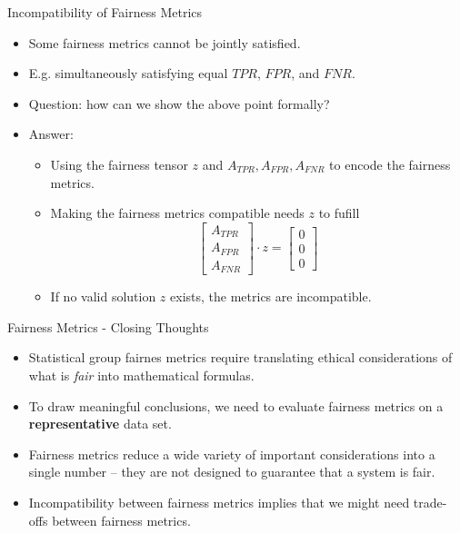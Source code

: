 \documentclass[11pt,compress,t,notes=noshow, xcolor=table]{beamer}
\begin{document}
\begin{vbframe}{Incompatibility of Fairness Metrics}
    \small
    \begin{itemize}
        \small
        \item Some fairness metrics cannot be jointly satisfied.
        \item E.g. simultaneously satisfying equal $TPR$, $FPR$, and $FNR$.
        \item Question: how can we show the above point formally?
        \item Answer: 
            \begin{itemize}
                \small
                \item Using the fairness tensor $z$ and $A_{TPR}, A_{FPR}, A_{FNR}$ to encode the fairness metrics.
                \vspace{5pt}
                
                \item Making the fairness metrics compatible needs $z$ to fufill
                $$\begin{bmatrix} A_{TPR} \\ A_{FPR} \\ A_{FNR} \end{bmatrix} \cdot z  = \begin{bmatrix} 0 \\ 0 \\ 0 \end{bmatrix}$$
                \vspace{5pt}
                
                \item If no valid solution $z$ exists, the metrics are incompatible.

            \end{itemize}
    \end{itemize}
\end{vbframe}

\begin{vbframe}{Fairness Metrics - Closing Thoughts}
    \begin{itemize}
        \item Statistical group fairnes metrics require translating ethical considerations of what is \emph{fair} into mathematical formulas.
        \vspace{15pt}
        
        \item To draw meaningful conclusions, we need to evaluate fairness metrics on a \textbf{representative} data set. 
        \vspace{15pt}
        
        \item Fairness metrics reduce a wide variety of important considerations into a single number -- they are not designed to guarantee that a system is fair.
        \vspace{15pt}
        
        \item Incompatibility between fairness metrics implies that we might need trade-offs between fairness metrics.
    \end{itemize}
\end{vbframe}
\end{document}

